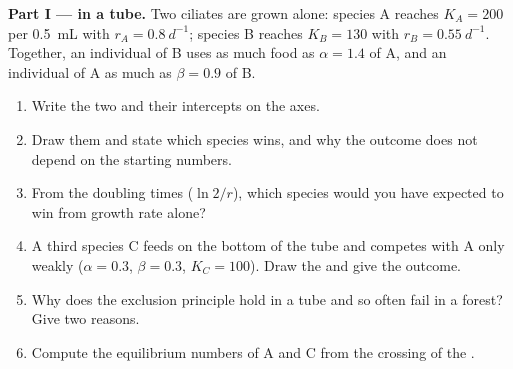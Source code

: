 \begin{problem}
\label{pb:b1:species-interactions:1}

\medskip
\noindent\textbf{Part I ---  in a tube.}
Two ciliates are grown alone: species A reaches $K_A = 200$ per
\qty{0.5}{mL} with $r_A = \qty{0.8}{d^{-1}}$; species B reaches
$K_B = 130$ with $r_B = \qty{0.55}{d^{-1}}$. Together, an individual
of B uses as much food as $\alpha = 1.4$ of A, and an individual of A
as much as $\beta = 0.9$ of B.
\begin{enumerate}
  \item Write the two  and their intercepts on the axes.
  \item Draw them and state which species wins, and why the outcome
        does not depend on the starting numbers.
  \item From the doubling times ($\ln 2/r$), which species would you
        have expected to win from growth rate alone?
  \item A third species C feeds on the bottom of the tube and competes
        with A only weakly ($\alpha = 0.3$, $\beta = 0.3$, $K_C = 100$).
        Draw the  and give the outcome.
  \item Why does the exclusion principle hold in a tube and so often
        fail in a forest? Give two reasons.
  \item Compute the equilibrium numbers of A and C from the crossing of
        the .
\end{enumerate}


\end{problem}
